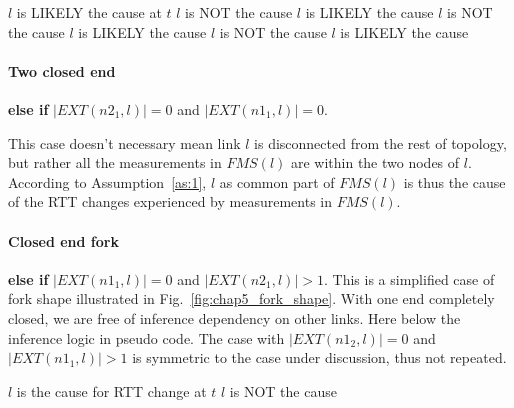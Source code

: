 \begin{algorithmic}
	\State $l$ is LIKELY the cause at $t$ 
\Else {}
	 
			\State $l$ is NOT the cause 
		\Else
			\State $l$ is LIKELY the cause 
		\EndIf
	 
			\State $l$ is NOT the cause 
		\Else
			\State $l$ is LIKELY the cause 
		\EndIf
	\Else {}
			\State $l$ is NOT the cause 
		\Else
			\State $l$ is LIKELY the cause 
		\EndIf
	\EndIf
\EndIf
\end{algorithmic}

\paragraph{Two closed end} \textbf{else if} $|EXT(n2_1,l)| = 0$ and $|EXT(n1_1,l)| = 0$.

This case doesn't necessary mean link $l$ is disconnected from the rest of topology, but rather all the measurements in $FMS(l)$ are within the two nodes of $l$. According to Assumption~\ref{as:1}, $l$ as common part of $FMS(l)$ is thus the cause of the RTT changes experienced by measurements in $FMS(l)$.


\paragraph{Closed end fork} \textbf{else if } $|EXT(n1_1,l)| = 0$ and $|EXT(n2_1,l)| > 1$.
This is a simplified case of fork shape illustrated in Fig.~\ref{fig:chap5_fork_shape}.
With one end completely closed, we are free of inference dependency on other links.
Here below the inference logic in pseudo code. The case with $|EXT(n1_2,l)| = 0$ and $|EXT(n1_1,l)| > 1$ is symmetric to the case under discussion, thus not repeated.

\begin{algorithmic}
	\State $l$ is the cause for RTT change at $t$ 
\Else
	\State $l$ is NOT the cause
\EndIf
\end{algorithmic}

